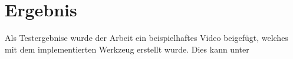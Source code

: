 \section{Ergebnis}

Als Testergebnise wurde der Arbeit ein beispielhaftes Video beigefügt, welches mit dem implementierten Werkzeug erstellt wurde. Dies kann unter %